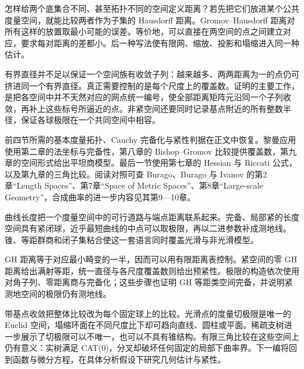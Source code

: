 怎样给两个底集合不同、甚至拓扑不同的空间定义距离？若先把它们放进某个公共度量空间，就能比较两者作为子集的 Hausdorff 距离。Gromov--Hausdorff 距离对所有这样的放置取最小可能的误差。等价地，可以直接在两空间的点之间建立对应，要求每对距离的差都小。后一种写法使有限网、缩放、投影和塌缩进入同一种估计。

\ProseParagraphBreak

有界直径并不足以保证一个空间族有收敛子列：越来越多、两两距离为一的点仍可挤进同一个有界直径。真正需要控制的是每个尺度上的覆盖数。证明的主要工作，是把各空间中并不天然对应的网点统一编号，使全部距离矩阵元沿同一个子列收敛，再补上这些标号所逼近的点。非紧空间还要同时记录基点附近的所有整数半径，保证各球极限在一个共同空间中相容。

\ProseParagraphBreak

前四节所需的基本度量拓扑、Cauchy 完备化与紧性判据在正文中恢复。黎曼应用使用第二章的法坐标与完备性，第八章的 Bishop--Gromov 比较提供覆盖数，第九章的空间形式给出平坦商模型。最后一节使用第七章的 Hessian 与 Riccati 公式，以及第九章的三角比较。阅读对照可查 Burago、Burago 与 Ivanov 的第2章“Length Spaces”、第7章“Space of Metric Spaces”、第8章“Large-scale Geometry”，合成曲率的进一步内容见其第9—10章\cite[第2章，第7—10章]{BuragoBuragoIvanov2001}。







\begin{chaptersummary}
曲线长度把一个度量空间中的可行道路与端点距离联系起来。完备、局部紧的长度空间具有紧闭球，近乎最短曲线的中点可以取极限，再以二进参数补成测地线。锥、等距群商和闭子集粘合使这一套语言同时覆盖光滑与非光滑模型。

\ProseParagraphBreak

GH 距离等于对应最小畸变的一半，因而可以用有限距离表控制。紧空间的零 GH 距离给出满射等距，统一直径与各尺度覆盖数则给出预紧性。极限的构造依次使用对角子列、零距离商与完备化；这些步骤也证明 GH 等距类空间完备，并说明紧测地空间的极限仍有测地线。

\ProseParagraphBreak

带基点收敛把整体比较改为每个固定球上的比较。光滑点的度量切极限是唯一的 Euclid 空间，塌缩环面在不同尺度比下却可趋向直线、圆柱或平面。稀疏支树进一步展示了切极限可以不唯一，也可以不具有锥结构。有限三角比较在这些空间上仍有意义：实树满足 CAT(0)，分叉却破坏任何固定的局部下曲率界。下一编将回到函数与微分方程，在具体分析假设下研究几何估计与紧性。
\end{chaptersummary}

